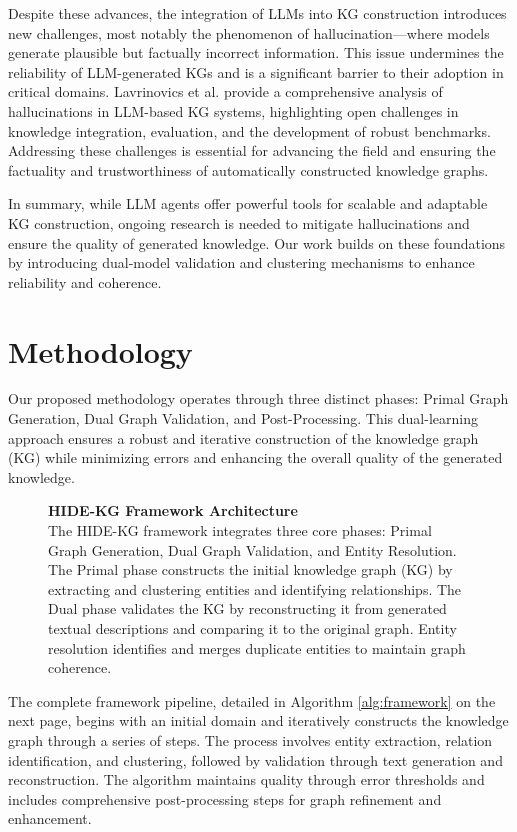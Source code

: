 \documentclass[11pt]{article}
\begin{document}
Despite these advances, the integration of LLMs into KG construction introduces new challenges, most notably the phenomenon of hallucination—where models generate plausible but factually incorrect information. This issue undermines the reliability of LLM-generated KGs and is a significant barrier to their adoption in critical domains. Lavrinovics et al. \cite{KGLLMHallucinations2025} provide a comprehensive analysis of hallucinations in LLM-based KG systems, highlighting open challenges in knowledge integration, evaluation, and the development of robust benchmarks. Addressing these challenges is essential for advancing the field and ensuring the factuality and trustworthiness of automatically constructed knowledge graphs.

In summary, while LLM agents offer powerful tools for scalable and adaptable KG construction, ongoing research is needed to mitigate hallucinations and ensure the quality of generated knowledge. Our work builds on these foundations by introducing dual-model validation and clustering mechanisms to enhance reliability and coherence.

\section{Methodology}

Our proposed methodology operates through three distinct phases: Primal Graph Generation, Dual Graph Validation, and Post-Processing. This dual-learning approach ensures a robust and iterative construction of the knowledge graph (KG) while minimizing errors and enhancing the overall quality of the generated knowledge.

\begin{figure}[H]
    \centering
    \resizebox{\columnwidth}{!}{}
    \caption{
        \textbf{HIDE-KG Framework Architecture} \\
        The HIDE-KG framework integrates three core phases: Primal Graph Generation, Dual Graph Validation, and Entity Resolution. The Primal phase constructs the initial knowledge graph (KG) by extracting and clustering entities and identifying relationships. The Dual phase validates the KG by reconstructing it from generated textual descriptions and comparing it to the original graph. Entity resolution identifies and merges duplicate entities to maintain graph coherence.
    }
    \label{fig:framework}
\end{figure}

The complete framework pipeline, detailed in Algorithm \ref{alg:framework} on the next page, begins with an initial domain and iteratively constructs the knowledge graph through a series of steps. The process involves entity extraction, relation identification, and clustering, followed by validation through text generation and reconstruction. The algorithm maintains quality through error thresholds and includes comprehensive post-processing steps for graph refinement and enhancement.
\end{document}
